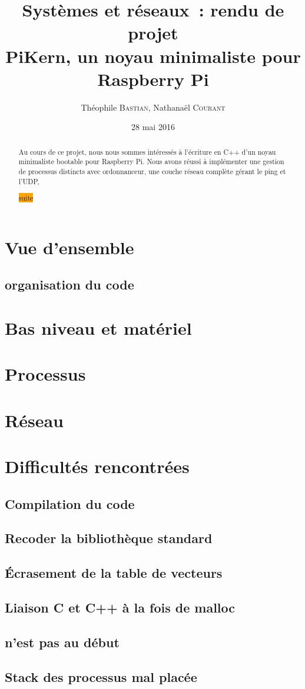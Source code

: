 \documentclass[11pt,a4paper]{article}
\author{Théophile \textsc{Bastian}, Nathanaël \textsc{Courant}}
\title{Systèmes et réseaux~: rendu de projet\\
{\small PiKern, un noyau minimaliste pour Raspberry Pi}}
\date{28 mai 2016}
\newcommand{\todo}[1]{\colorbox{orange}{\color{blue}{\Large TODO:} #1}}
\begin{document}
\maketitle

\begin{abstract}
Au cours de ce projet, nous nous sommes intéressés à l'écriture en C++ d'un
noyau minimaliste bootable pour Raspberry Pi. Nous avons réussi à implémenter
une gestion de processus distincts avec ordonnanceur, une couche réseau
complète gérant le ping et l'UDP,

	\todo{suite}
\end{abstract}

\tableofcontents
\newpage

\section{Vue d'ensemble}

\subsection{organisation du code}

\section{Bas niveau et matériel}

\section{Processus}

\section{Réseau}

\section{Difficultés rencontrées}

\subsection{Compilation du code}\label{ssec:diff:compil}
\todo{}
\subsection{Recoder la bibliothèque standard}\label{ssec:diff:stdlib}
\todo{}
\subsection{Écrasement de la table de vecteurs}\label{ssec:diff:delvect}
\todo{}
\subsection{Liaison C et C++ à la fois de malloc}\label{ssec:diff:linkage}
\todo{}
\subsection{ n'est pas au début}\label{ssec:diff:startup}
\todo{}
\subsection{Stack des processus mal placée}\label{ssec:diff:async_stack}
\todo{}
\end{document}
